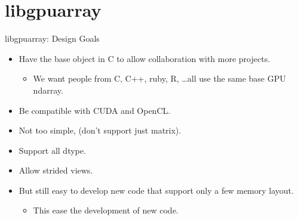 \documentclass[utf8x,xcolor=pdftex,dvipsnames,table]{beamer}
\begin{document}


\section{libgpuarray}
\begin{frame}
  \tableofcontents[currentsection]
\end{frame}

\begin{frame}{libgpuarray: Design Goals}
  \begin{itemize}
  \item Have the base object in C to allow collaboration with more projects.
    \begin{itemize}
    \item We want people from C, C++, ruby, R, \ldots all use the same base GPU ndarray.
    \end{itemize}
  \item Be compatible with CUDA and OpenCL.
  \item Not too simple, (don’t support just matrix).
  \item Support all dtype.
  \item Allow strided views.
  \item But still easy to develop new code that support only a few memory layout.
    \begin{itemize}
    \item This ease the development of new code.
    \end{itemize}
  \end{itemize}
\end{frame}
\end{document}
